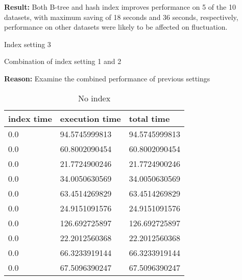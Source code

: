\begin{itemize*}
\par \textbf{Result:} Both B-tree and hash index improves performance on 5 of the 10 datasets, with maximum saving of 18 seconds and 36 seconds, respectively, performance on other datasets were likely to be affected on fluctuation.
\item{Index setting 3}
\par Combination of index setting 1 and 2
\par \textbf{Reason:} Examine the combined performance of previous settings

\begin{table}[H]
\begin{center}
\begin{tabular}{|l|l|l|}
\hline
index time & execution time & total time     \\ \hline
0.0 & 94.5745999813 & 94.5745999813 \\ \hline
0.0 & 60.8002090454 & 60.8002090454 \\ \hline
0.0 & 21.7724900246 & 21.7724900246 \\ \hline
0.0 & 34.0050630569 & 34.0050630569 \\ \hline
0.0 & 63.4514269829 & 63.4514269829 \\ \hline
0.0 & 24.9151091576 & 24.9151091576 \\ \hline
0.0 & 126.692725897 & 126.692725897 \\ \hline
0.0 & 22.2012560368 & 22.2012560368 \\ \hline
0.0 & 66.3233919144 & 66.3233919144 \\ \hline
0.0 & 67.5096390247 & 67.5096390247 \\ \hline
\end{tabular}
\end{center}
\caption{No index}
\end{table}


\end{itemize*}
